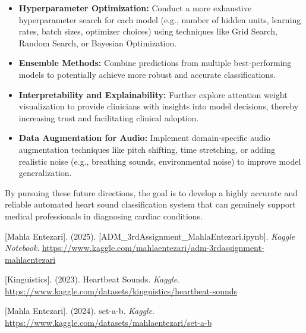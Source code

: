 \documentclass[a4paper]{article}
\begin{document}
\begin{multicols}{2}
\begin{itemize}
\begin{itemize}
        \end{itemize}
    \item \textbf{Hyperparameter Optimization:} Conduct a more exhaustive hyperparameter search for each model (e.g., number of hidden units, learning rates, batch sizes, optimizer choices) using techniques like Grid Search, Random Search, or Bayesian Optimization.
    \item \textbf{Ensemble Methods:} Combine predictions from multiple best-performing models to potentially achieve more robust and accurate classifications.
    \item \textbf{Interpretability and Explainability:} Further explore attention weight visualization to provide clinicians with insights into model decisions, thereby increasing trust and facilitating clinical adoption.
    \item \textbf{Data Augmentation for Audio:} Implement domain-specific audio augmentation techniques like pitch shifting, time stretching, or adding realistic noise (e.g., breathing sounds, environmental noise) to improve model generalization.
\end{itemize}
By pursuing these future directions, the goal is to develop a highly accurate and reliable automated heart sound classification system that can genuinely support medical professionals in diagnosing cardiac conditions.

\begin{thebibliography}{5}

    [Mahla Entezari]. (2025). [ADM\_3rdAssignment\_MahlaEntezari.ipynb]. \textit{Kaggle Notebook}.
    \url{https://www.kaggle.com/mahlaentezari/adm-3rdassignment-mahlaentezari} %

    [Kinguistics]. (2023). Heartbeat Sounds. \textit{Kaggle}.
    \url{https://www.kaggle.com/datasets/kinguistics/heartbeat-sounds}

    [Mahla Entezari]. (2024). set-a-b. \textit{Kaggle}.
    \url{https://www.kaggle.com/datasets/mahlaentezari/set-a-b}

\end{thebibliography}

\end{multicols}
\end{document}
